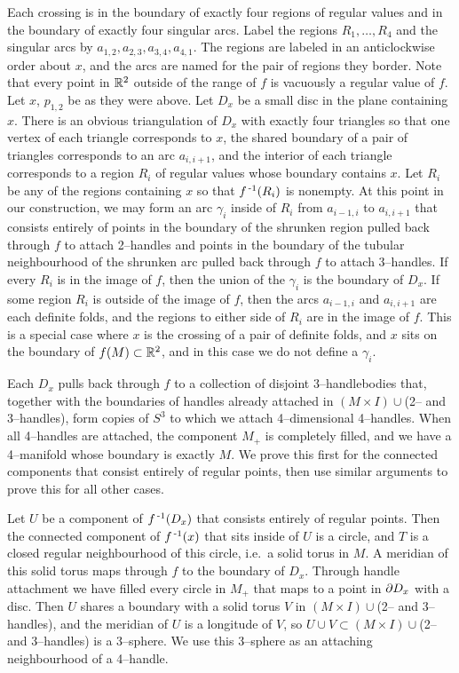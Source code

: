 Each crossing is in the boundary of exactly four regions of regular values and in the boundary of exactly four singular arcs.
Label the regions $R_1,\dots,R_4$ and the singular arcs by $a_{1,2},a_{2,3}, a_{3,4}, a_{4,1}$.
The regions are labeled in an anticlockwise order about $x$, and the arcs are named for the pair of regions they border.
Note that every point in $\mathbb{R}^2$ outside of the range of $f$ is vacuously a regular value of $f$.
Let $x$, $p_{1,2}$ be as they were above.
Let $D_x$ be a small disc in the plane containing $x$.
There is an obvious triangulation of $D_x$ with exactly four triangles so that one vertex of each triangle corresponds to $x$, the shared boundary of a pair of triangles corresponds to an arc $a_{i,i+1}$, and the interior of each triangle corresponds to a region $R_i$ of regular values whose boundary contains $x$.
Let $R_i$ be any of the regions containing $x$ so that $f^{\,\text{-}1} (R_i)$ is nonempty.
At this point in our construction, we may form an arc $\gamma_i$ inside of $R_i$ from $a_{i-1,i}$ to $a_{i,i+1}$ that consists entirely of points in the boundary of the shrunken region pulled back through $f$ to attach 2--handles and points in the boundary of the tubular neighbourhood of the shrunken arc pulled back through $f$ to attach 3--handles.
If every $R_i$ is in the image of $f$, then the union of the $\gamma_i$ is the boundary of $D_x$.
If some region $R_i$ is outside of the image of $f$, then the arcs $a_{i-1,i}$ and $a_{i,i+1}$ are each definite folds, and the regions to either side of $R_i$ are in the image of $f$.
This is a special case where $x$ is the crossing of a pair of definite folds, and $x$ sits on the boundary of $f(M)\subset\mathbb{R}^2$, and in this case we do not define a $\gamma_i$.

Each $D_x$ pulls back through $f$ to a collection of disjoint 3--handlebodies that, together with the boundaries of handles already attached in $(M\times I)\cup$({2-- and 3--handles}), form copies of $S^3$ to which we attach 4--dimensional 4--handles.
When all 4--handles are attached, the component $M_+$ is completely filled, and we have a 4--manifold whose boundary is exactly $M$.
We prove this first for the connected components that consist entirely of regular points, then use similar arguments to prove this for all other cases.

Let $U$ be a component of $f^{\,\text{-}1} (D_x)$ that consists entirely of regular points.
Then the connected component of $f^{\,\text{-}1} (x)$ that sits inside of $U$ is a circle, and $T$ is a closed regular neighbourhood of this circle, i.e.\ a solid torus in $M$.
A meridian of this solid torus maps through $f$ to the boundary of $D_x$.
Through handle attachment we have filled every circle in $M_+$ that maps to a point in $\partial D_x$ with a disc.
Then $U$ shares a boundary with a solid torus $V$ in $(M\times I)\cup$(2-- and 3--handles), and the meridian of $U$ is a longitude of $V$, so $U\cup V\subset (M\times I)\cup$(2-- and 3--handles) is a 3--sphere.
We use this 3--sphere as an attaching neighbourhood of a 4--handle.


